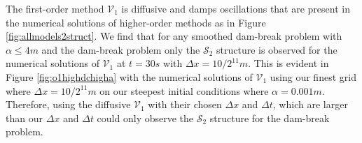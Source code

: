 \documentclass[times]{elsarticle}
\begin{document}
The first-order method $\mathcal{V}_1$ is diffusive \cite{Zoppou-etal-2017} and damps oscillations that are present in the numerical solutions of higher-order methods as in Figure \ref{fig:allmodels2struct}. We find that for any smoothed dam-break problem with $\alpha \le 4m$ and the dam-break problem only the $\mathcal{S}_2$ structure is observed for the numerical solutions of $\mathcal{V}_1$ at $t=30s$ with $\Delta x = 10/2 ^{11}m$. This is evident in Figure \ref{fig:o1highdchigha} with the numerical solutions of $\mathcal{V}_1$ using our finest grid where $\Delta x = 10/2^{11}m$ on our steepest initial conditions where $\alpha = 0.001m$. Therefore, \citet{Hank-etal-2010-2034} using the diffusive $\mathcal{V}_1$ with their chosen $\Delta x$ and $\Delta t$, which are larger than our $\Delta x$ and $\Delta t$ could only observe the $\mathcal{S}_2$ structure for the dam-break problem. 
\end{document}
